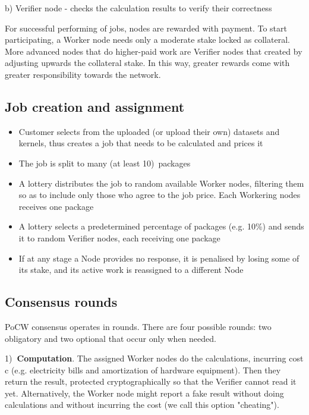 \documentclass{article}
\begin{document}
b) Verifier node - checks the calculation results to verify their correctness

For successful performing of jobs, nodes are rewarded with payment. To start
participating, a Worker node needs only a moderate stake locked as
collateral. More advanced nodes that do higher-paid work are Verifier nodes
that created by adjusting upwards the collateral stake. In this way, greater
rewards come with greater responsibility towards the network.

\subsection{Job creation and assignment}

\begin{itemize}
\item Customer selects from the uploaded (or upload their own) datasets and
kernels, thus creates a job that needs to be calculated and prices it

\item The job is split to many (at least 10)\ packages

\item A lottery distributes the job to random available Worker nodes,
filtering them so as to include only those who agree to the job price. Each
Workering nodes receives one package

\item A lottery selects a predetermined percentage of packages (e.g. 10\%)
and sends it to random Verifier nodes, each receiving one package

\item If at any stage a Node provides no response, it is penalised by losing
some of its stake, and its active work is reassigned to a different Node
\end{itemize}

\subsection{Consensus rounds}

PoCW consensus operates in rounds. There are four possible rounds: two
obligatory and two optional that occur only when needed.

1)\textbf{\ Computation}. The assigned Worker nodes do the calculations,
incurring cost c (e.g. electricity bills and amortization of hardware
equipment). Then they return the result, protected cryptographically so that
the Verifier cannot read it yet. Alternatively, the Worker node might report
a fake result without doing calculations and without incurring the cost (we
call this option "cheating").
\end{document}
